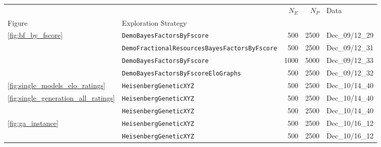 \begin{tabular}{llrrl}
\hline
                          &                                                      &                                    $N_E$ &                                    $N_P$ &                                     Data \\
Figure & Exploration Strategy &                                          &                                          &                                          \\
\midrule
\multirow{4}{*}{\cref{fig:bf_by_fscore}} & \texttt{DemoBayesFactorsByFscore} &                                      500 &                                     2500 &                           Dec\_09/12\_29 \\
                          & \texttt{DemoFractionalResourcesBayesFactorsByFscore} &                                      500 &                                     2500 &                           Dec\_09/12\_31 \\
                          & \texttt{DemoBayesFactorsByFscore} &                                     1000 &                                     5000 &                           Dec\_09/12\_33 \\
                          & \texttt{DemoBayesFactorsByFscoreEloGraphs} &                                      500 &                                     2500 &                           Dec\_09/12\_32 \\
\cline{1-5}
\cref{fig:single_models_elo_ratings} & \texttt{HeisenbergGeneticXYZ} &                                      500 &                                     2500 &                           Dec\_10/14\_40 \\
\multirow{2}{*}{\cref{fig:single_generation_all_ratings}} & \texttt{HeisenbergGeneticXYZ} &                                      500 &                                     2500 &                           Dec\_10/14\_40 \\
                          & \texttt{HeisenbergGeneticXYZ} &                                      500 &                                     2500 &                           Dec\_10/14\_40 \\
\cline{1-5}
\multirow{2}{*}{\cref{fig:ga_instance}} & \texttt{HeisenbergGeneticXYZ} &                                      500 &                                     2500 &                           Dec\_10/16\_12 \\
                          & \texttt{HeisenbergGeneticXYZ} &                                      500 &                                     2500 &                           Dec\_10/16\_12 \\

\end{tabular}

